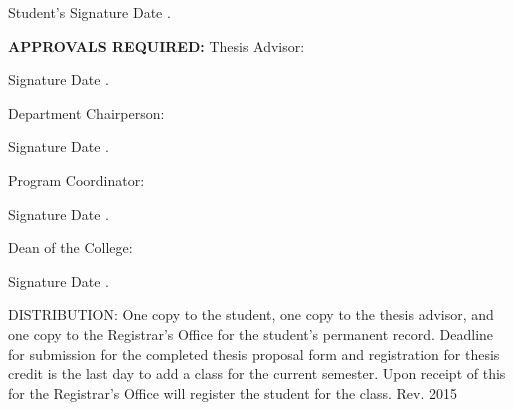 \documentclass{article}
\begin{document}
\begin{flushright}
\underline{\hspace{15em}} \underline{\hspace{10em}}\linebreak
Student's Signature \hspace{2.1cm} Date \hspace{2.4cm} {\color{white} .}
\end{flushright}
\begin{flushleft}
\textbf{APPROVALS REQUIRED:} \linebreak
Thesis Advisor:
\begin{flushright}
\underline{\hspace{15em}} \underline{\hspace{10em}}\linebreak
Signature \hspace{3.7cm} Date\hspace{2.5cm} {\color{white} .}\linebreak
\end{flushright}
Department Chairperson:
\begin{flushright}
\underline{\hspace{15em}} \underline{\hspace{10em}}\linebreak
Signature \hspace{3.7cm} Date\hspace{2.5cm} {\color{white} .}\linebreak
\end{flushright}
Program Coordinator:
\begin{flushright}
\underline{\hspace{15em}} \underline{\hspace{10em}}\linebreak
Signature \hspace{3.7cm} Date\hspace{2.5cm} {\color{white} .}\linebreak
\end{flushright}
Dean of the College:
\begin{flushright}
\underline{\hspace{15em}} \underline{\hspace{10em}}\linebreak
Signature \hspace{3.7cm} Date\hspace{2.5cm} {\color{white} .}\linebreak
\end{flushright}
\end{flushleft}
\begin{flushleft}
DISTRIBUTION: One copy to the student, one copy to the thesis advisor, and one copy to the Registrar’s Office for the student’s permanent record.  Deadline for submission for the completed thesis proposal form and registration for thesis credit is the last day to add a class for the current semester.  Upon receipt of this for the Registrar’s Office will register the student for the class.\linebreak \linebreak 
Rev. 2015
\end{flushleft}
\newpage
\end{document}
